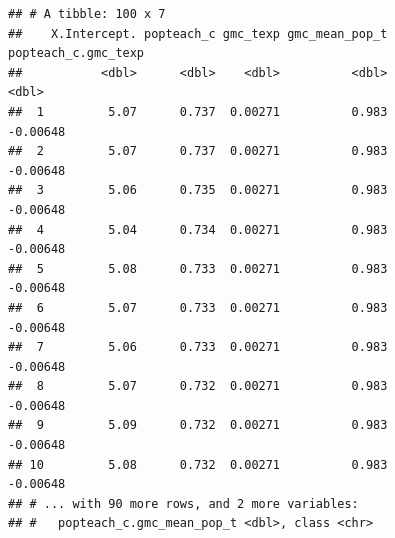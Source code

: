 \documentclass[]{article}
\newenvironment{Shaded}{\begin{snugshade}}{\end{snugshade}}
\newcommand{\KeywordTok}[1]{\textcolor[rgb]{0.13,0.29,0.53}{\textbf{#1}}}
\newcommand{\DataTypeTok}[1]{\textcolor[rgb]{0.13,0.29,0.53}{#1}}
\newcommand{\DecValTok}[1]{\textcolor[rgb]{0.00,0.00,0.81}{#1}}
\newcommand{\StringTok}[1]{\textcolor[rgb]{0.31,0.60,0.02}{#1}}
\newcommand{\ControlFlowTok}[1]{\textcolor[rgb]{0.13,0.29,0.53}{\textbf{#1}}}
\newcommand{\OperatorTok}[1]{\textcolor[rgb]{0.81,0.36,0.00}{\textbf{#1}}}
\newcommand{\NormalTok}[1]{#1}
\begin{document}
\begin{Shaded}
\end{Shaded}

\begin{verbatim}
## # A tibble: 100 x 7
##    X.Intercept. popteach_c gmc_texp gmc_mean_pop_t popteach_c.gmc_texp
##           <dbl>      <dbl>    <dbl>          <dbl>               <dbl>
##  1         5.07      0.737  0.00271          0.983            -0.00648
##  2         5.07      0.737  0.00271          0.983            -0.00648
##  3         5.06      0.735  0.00271          0.983            -0.00648
##  4         5.04      0.734  0.00271          0.983            -0.00648
##  5         5.08      0.733  0.00271          0.983            -0.00648
##  6         5.07      0.733  0.00271          0.983            -0.00648
##  7         5.06      0.733  0.00271          0.983            -0.00648
##  8         5.07      0.732  0.00271          0.983            -0.00648
##  9         5.09      0.732  0.00271          0.983            -0.00648
## 10         5.08      0.732  0.00271          0.983            -0.00648
## # ... with 90 more rows, and 2 more variables:
## #   popteach_c.gmc_mean_pop_t <dbl>, class <chr>
\end{verbatim}
\end{document}
